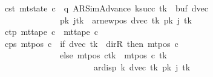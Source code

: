 \begin{isabellebody}
\ \ \ \ \ c{\isacharprime}{\kern0pt}{\isacharunderscore}{\kern0pt}st{\isacharcolon}{\kern0pt}\ {\isachardoublequoteopen}mt{\isacharunderscore}{\kern0pt}state\ c{\isacharprime}{\kern0pt}\ {\isacharequal}{\kern0pt}\ {\isacharparenleft}{\kern0pt}q{\isacharcomma}{\kern0pt}\ AR{\isacharunderscore}{\kern0pt}SimAdvance{\isacharcomma}{\kern0pt}\ k{\isacharunderscore}{\kern0pt}succ\ {\isacharquery}{\kern0pt}tk{\isacharcomma}{\kern0pt}\ {}{\isacharcomma}{\kern0pt}\ buf{}{\isacharcomma}{\kern0pt}\ dvec{\isacharcomma}{\kern0pt}\isanewline
\ \ \ \ \ \ \ \ \ \ \ \ \ \ \ \ \ \ {\isacharparenleft}{\kern0pt}{\isacharquery}{\kern0pt}pk\ j{\isacharparenright}{\kern0pt}{\isacharparenleft}{\kern0pt}{\isacharquery}{\kern0pt}tk\ {\isacharcolon}{\kern0pt}{\isacharequal}{\kern0pt}\ ar{\isacharunderscore}{\kern0pt}newpos\ {\isacharparenleft}{\kern0pt}dvec\ {\isacharquery}{\kern0pt}tk{\isacharparenright}{\kern0pt}\ {\isacharparenleft}{\kern0pt}{\isacharquery}{\kern0pt}pk\ j\ {\isacharquery}{\kern0pt}tk{\isacharparenright}{\kern0pt}{\isacharparenright}{\kern0pt}{\isacharparenright}{\kern0pt}{\isachardoublequoteclose}\isanewline
\ \ \ \ \ c{\isacharprime}{\kern0pt}{\isacharunderscore}{\kern0pt}tp{\isacharcolon}{\kern0pt}\ {\isachardoublequoteopen}mt{\isacharunderscore}{\kern0pt}tape\ c{\isacharprime}{\kern0pt}\ {\isacharequal}{\kern0pt}\ mt{\isacharunderscore}{\kern0pt}tape\ c{\isachardoublequoteclose}\isanewline
\ \ \ \ \ c{\isacharprime}{\kern0pt}{\isacharunderscore}{\kern0pt}ps{\isacharcolon}{\kern0pt}\ {\isachardoublequoteopen}mt{\isacharunderscore}{\kern0pt}pos\ c{\isacharprime}{\kern0pt}\ {\isacharequal}{\kern0pt}\ {\isacharparenleft}{\kern0pt}if\ dvec\ {\isacharquery}{\kern0pt}tk\ {\isacharequal}{\kern0pt}\ dir{\isachardot}{\kern0pt}R\ then\ mt{\isacharunderscore}{\kern0pt}pos\ c\isanewline
\ \ \ \ \ \ \ \ \ \ \ \ \ \ \ \ \ \ else\ {\isacharparenleft}{\kern0pt}mt{\isacharunderscore}{\kern0pt}pos\ c{\isacharparenright}{\kern0pt}{\isacharparenleft}{\kern0pt}{\isacharquery}{\kern0pt}tk\ {\isacharcolon}{\kern0pt}{\isacharequal}{\kern0pt}\ mt{\isacharunderscore}{\kern0pt}pos\ c\ {\isacharquery}{\kern0pt}tk\isanewline
\ \ \ \ \ \ \ \ \ \ \ \ \ \ \ \ \ \ \ \ \ \ \ \ \ {\isacharminus}{\kern0pt}\ ar{\isacharunderscore}{\kern0pt}disp\ {\isacharquery}{\kern0pt}k\ {\isacharparenleft}{\kern0pt}dvec\ {\isacharquery}{\kern0pt}tk{\isacharparenright}{\kern0pt}\ {\isacharparenleft}{\kern0pt}{\isacharquery}{\kern0pt}pk\ j\ {\isacharquery}{\kern0pt}tk{\isacharparenright}{\kern0pt}{\isacharparenright}{\kern0pt}{\isacharparenright}{\kern0pt}{\isachardoublequoteclose}\isanewline

\end{isabellebody}
